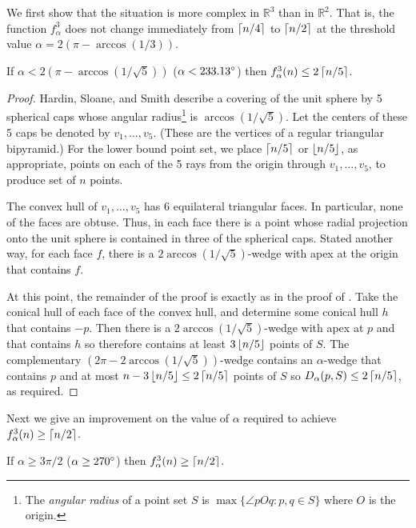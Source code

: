 \documentclass{dmtcs}
\newcommand{\R}{\mathbb{R}}
\begin{document}
We first show that the situation is more complex in $\R^3$
than in $\R^2$.  That is, the function $f_\alpha^3$ does not
change immediately from $\left\lceil n/4 \right\rceil$ to $\left\lceil n/2 \right\rceil$ at the threshold
value $\alpha=2(\pi-\arccos(1/3))$.

\begin{lem}
If $\alpha < 2(\pi-\arccos(1/\sqrt{5}))$ ($\alpha < 233.13^\circ$) then $f^3_\alpha(n) \le 2\left\lceil n/5 \right\rceil$.
\end{lem}

\begin{proof}
Hardin, Sloane, and Smith \cite{hssXX} describe a covering of the unit
sphere by 5 spherical caps whose angular radius\footnote{The
\emph{angular radius} of a point set $S$ is $\max\{\angle pOq : p,q\in
S\}$ where $O$ is the origin.} is $\arccos(1/\sqrt{5})$.  Let the
centers of these 5 caps be denoted by $v_1,\ldots,v_5$. (These are the
vertices of a regular triangular bipyramid.) For the lower bound point
set, we place $\left\lceil n/5 \right\rceil$ or $\left\lfloor n/5 \right\rfloor$, as appropriate, points on
each of the 5 rays from the origin through $v_1,\ldots,v_5$, to
produce set of $n$ points. 

The convex hull of $v_1,\ldots,v_5$ has 6 equilateral triangular
faces.  In particular, none of the faces are obtuse.  Thus, in each
face there is a point whose radial projection onto the unit sphere is
contained in three of the spherical caps. Stated another way, for each
face $f$, there is a $2\arccos(1/\sqrt{5})$-wedge with apex at the
origin that contains $f$.

At this point, the remainder of the proof is exactly as in the proof
of .  Take the conical hull of each face of the convex
hull, and determine some conical hull $h$ that contains $-p$.  Then
there is a $2\arccos(1/\sqrt{5})$-wedge with apex at $p$ and that
contains $h$ so therefore contains at least $3\left\lfloor n/5 \right\rfloor$ points of
$S$.  The complementary $(2\pi-2\arccos(1/\sqrt{5}))$-wedge contains
an $\alpha$-wedge that contains $p$ and at most $n-3\left\lfloor n/5 \right\rfloor\le
2\left\lceil n/5 \right\rceil$ points of $S$ so $D_\alpha(p,S)\le 2\left\lceil n/5 \right\rceil$, as
required.  
\end{proof}

Next we give an improvement on the value of $\alpha$ required to
achieve $f_\alpha^3(n)\ge\left\lceil n/2 \right\rceil$.

\begin{lem} 
If $\alpha\ge 3\pi/2$ ($\alpha\ge 270^\circ$) then $f_\alpha^3(n)\ge
\left\lceil n/2 \right\rceil$.
\end{lem}
\end{document}
